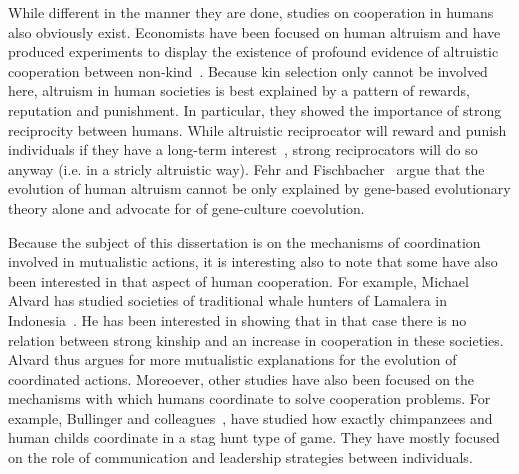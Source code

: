 
    While different in the manner they are done, studies on cooperation in humans also obviously exist. Economists have been focused on human altruism and have produced experiments to display the existence of profound evidence of altruistic cooperation between non-kind~\cite{Fehr2002, Fehr2003}. Because kin selection only cannot be involved here, altruism in human societies is best explained by a pattern of rewards, reputation and punishment. In particular, they showed the importance of strong reciprocity between humans. While altruistic reciprocator will reward and punish individuals if they have a long-term interest~\cite{Trivers1971}, strong reciprocators will do so anyway (i.e. in a stricly altruistic way). Fehr and Fischbacher~\cite{Fehr2003} argue that the evolution of human altruism cannot be only explained by gene-based evolutionary theory alone and advocate for of gene-culture coevolution.

    Because the subject of this dissertation is on the mechanisms of coordination involved in mutualistic actions, it is interesting also to note that some have also been interested in that aspect of human cooperation. For example, Michael Alvard has studied societies of traditional whale hunters of Lamalera in Indonesia~\cite{Alvard2001, Alvard2003}. He has been interested in showing that in that case there is no relation between strong kinship and an increase in cooperation in these societies. Alvard thus argues for more mutualistic explanations for the evolution of coordinated actions. Moreoever, other studies have also been focused on the mechanisms with which humans coordinate to solve cooperation problems. For example, Bullinger and colleagues~\cite{Bullinger2011, Duguid2014}, have studied how exactly chimpanzees and human childs coordinate in a stag hunt type of game. They have mostly focused on the role of communication and leadership strategies between individuals.

